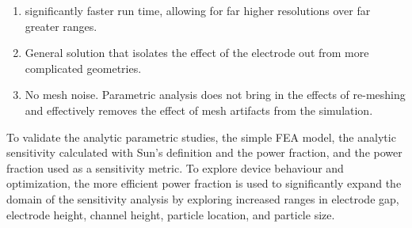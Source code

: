 \begin{enumerate}
	\item significantly faster run time, allowing for far higher resolutions over far greater ranges.
	\item General solution that isolates the effect of the electrode out from more complicated geometries.
	\item No mesh noise. Parametric analysis does not bring in the effects of re-meshing and effectively removes the effect of mesh artifacts from the simulation.
\end{enumerate}

\par To validate the analytic parametric studies, the simple FEA model, the analytic sensitivity calculated with Sun's definition and the power fraction, and the power fraction used as a sensitivity metric. To explore device behaviour and optimization, the more efficient power fraction is used to significantly expand the domain of the sensitivity analysis by exploring increased ranges in electrode gap, electrode height, channel height, particle location, and particle size. 

